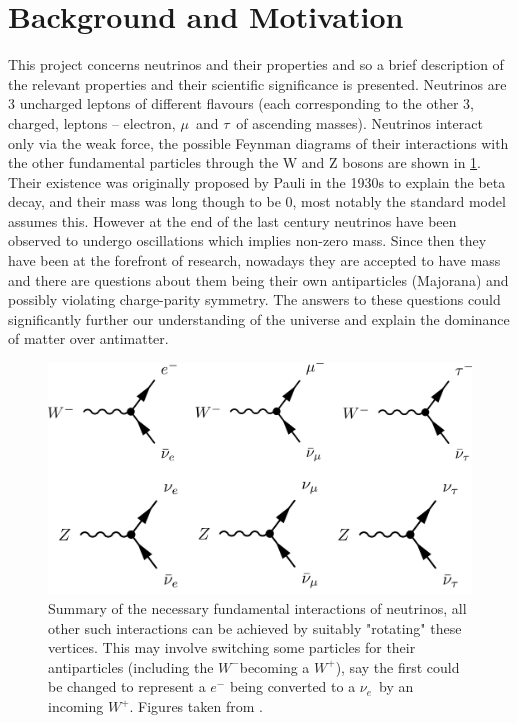 \documentclass[a4paper,12pt]{article}
\newcommand{\Mu}{$\mu$}
\newcommand{\Tau}{$\tau$}
\newcommand{\Ne}{$\nu_e$}
\newcommand{\Wp}{$W^+$}
\newcommand{\Wm}{$W^-$}
\begin{document}
\section{Background and Motivation}
This project concerns neutrinos and their properties and so a brief description of the relevant properties and their scientific significance is presented.
Neutrinos are 3 uncharged leptons of different flavours (each corresponding to the other 3, charged, leptons -- electron, \Mu\ and \Tau\ of ascending masses).
Neutrinos interact only via the weak force, the possible Feynman diagrams of their interactions with the other fundamental particles through the W and Z bosons are shown in \cref{fig:nu_feyn}.
Their existence was originally proposed by Pauli in the 1930s to explain the beta decay, and their mass was long though to be 0, most notably the standard model assumes this.
However at the end of the last century neutrinos have been observed to undergo oscillations which implies non-zero mass.
Since then they have been at the forefront of research, nowadays they are accepted to have mass and there are questions about them being their own antiparticles (Majorana) and possibly violating charge-parity symmetry.
The answers to these questions could significantly further our understanding of the universe and explain the dominance of matter over antimatter.

\begin{figure}[h]
    \centering
    \includegraphics{figures/NeutrinoFeynman.jpg}
    \caption{
        Summary of the necessary fundamental interactions of neutrinos, all other such interactions can be achieved by suitably "rotating" these vertices.
        This may involve switching some particles for their antiparticles (including the \Wm becoming a \Wp), say the first could be changed to represent a $e^-$ being converted to a \Ne\ by an incoming \Wp.
        Figures taken from \cite{potterFeynmanDiagramsParticlea}.
    }\label{fig:nu_feyn}
\end{figure}
\end{document}
